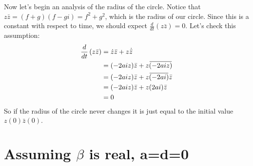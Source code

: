 \documentclass[10pt]{article}
\newcommand{\overbar}[1]{\mkern 1.5mu\overline{\mkern-1.5mu#1\mkern-1.5mu}\mkern 1.5mu}
\begin{document}
Now let's begin an analysis of the radius of the circle.
Notice that $z\bar z=(f+g)(f-gi)=f^2+g^2$, which is the radius of our circle. 
Since this is a constant with respect to time, we should expect $\frac{d}{dt}\left(z\bar z\right)=0$.
Let's check this assumption:
\begin{align*}
\frac{d}{dt}\left(z\bar z\right)&=\dot z\bar z+z\dot {\bar z}\\
&=(-2aiz)\bar z+z\overbar{(-2aiz)}\\
&=(-2aiz)\bar z+z\overbar{(-2ai)}\bar z\\
&=(-2aiz)\bar z+z(2ai)\bar z\\
&=0
\end{align*}
So if the radius of the circle never changes it is just equal to the initial value $z(0)\bar z(0)$.

\section{Assuming $\beta$ is real, a=d=0}
\end{document}
